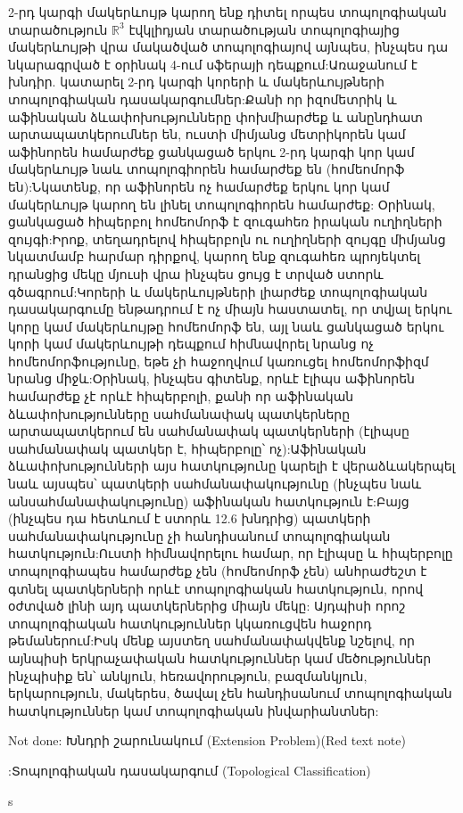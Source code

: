 2-րդ կարգի մակերևույթ կարող ենք դիտել որպես տոպոլոգիական տարածություն $\mathbb{R}^3$ էվկլիդյան տարածության տոպոլոգիայից մակերևույթի վրա մակածված տոպոլոգիայով այնպես, ինչպես դա նկարագրված է օրինակ 4-ում սֆերայի դեպքում:Առաջանում է խնդիր. կատարել 2-րդ կարգի կորերի և մակերևույթների տոպոլոգիական դասակարգումներ:Քանի որ իզոմետրիկ և աֆինական ձևափոխությունները փոխմիարժեք և անընդհատ արտապատկերումներ են, ուստի միմյանց մետրիկորեն կամ աֆինորեն համարժեք ցանկացած երկու 2-րդ կարգի կոր կամ մակերևույթ նաև տոպոլոգիորեն համարժեք են (հոմեոմորֆ են):Նկատենք, որ աֆինորեն ոչ համարժեք երկու կոր կամ մակերևույթ կարող են լինել տոպոլոգիորեն համարժեք: Օրինակ, ցանկացած հիպերբոլ հոմեոմորֆ է զուգահեռ իրական ուղիղների զույգի:Իրոք, տեղադրելով հիպերբոլն ու ուղիղների զույգը միմյանց նկատմամբ հարմար դիրքով, կարող ենք զուգահեռ պրոյեկտել դրանցից մեկը մյուսի վրա ինչպես ցույց է տրված ստորև գծագրում:Կորերի և մակերևույթների լիարժեք տոպոլոգիական դասակարգումը ենթադրում է ոչ միայն հաստատել, որ տվյալ երկու կորը կամ մակերևույթը հոմեոմորֆ են, այլ նաև ցանկացած երկու կորի կամ մակերևույթի դեպքում հիմնավորել նրանց ոչ հոմեոմորֆությունը, եթե չի հաջողվում կառուցել հոմեոմորֆիզմ նրանց միջև:Օրինակ, ինչպես գիտենք, որևէ էլիպս աֆինորեն համարժեք չէ որևէ հիպերբոլի, քանի որ աֆինական ձևափոխությունները սահմանափակ պատկերները արտապատկերում են սահմանափակ պատկերների (էլիպսը սահմանափակ պատկեր է, հիպերբոլը՝ ոչ):Աֆինական ձևափոխությունների այս հատկությունը կարելի է վերաձևակերպել նաև այսպես՝ պատկերի սահմանափակությունը (ինչպես նաև անսահմանափակությունը) աֆինական հատկություն է:Բայց (ինչպես դա հետևում է ստորև 12.6 խնդրից) պատկերի սահմանափակությունը չի հանդիսանում տոպոլոգիական հատկություն:Ուստի հիմնավորելու համար, որ էլիպսը և հիպերբոլը տոպոլոգիապես համարժեք չեն (հոմեոմորֆ չեն) անհրաժեշտ է գտնել պատկերների որևէ տոպոլոգիական հատկություն, որով օժտված լինի այդ պատկերներից միայն մեկը: Այդպիսի որոշ տոպոլոգիական հատկություններ կկառուցվեն հաջորդ թեմաներում:Իսկ մենք այստեղ սահմանափակվենք նշելով, որ այնպիսի երկրաչափական հատկություններ կամ մեծություններ ինչպիսիք են՝ անկյուն, հեռավորություն, բազմանկյուն, երկարություն, մակերես, ծավալ չեն հանդիսանում տոպոլոգիական հատկություններ կամ տոպոլոգիական ինվարիանտներ:



Not done:
Խնդրի շարունակում (Extension Problem)(Red text note)


:Տոպոլոգիական դասակարգում (Topological Classification)

s